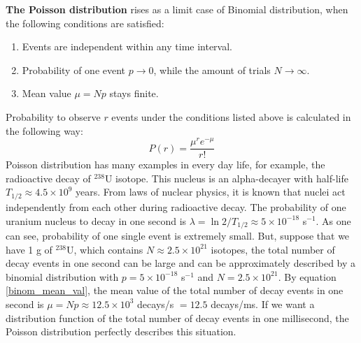 \documentclass[12pt,a4paper]{report}
\begin{document}
\newpage
\textbf{The Poisson distribution} rises as a limit case of Binomial distribution, when the following conditions are satisfied:
\begin{enumerate}
\item Events are independent within any time interval.
\item Probability of one event $p \rightarrow 0$, while the amount of trials $N \rightarrow \infty$. 
\item Mean value $\mu = Np$ stays finite.
\end{enumerate}
Probability to observe $r$ events under the conditions listed above is calculated in the following way:
\begin{equation} \label{poisson_dist}
P(r) = \frac{\mu^r e^{-\mu}}{r!}
\end{equation}
Poisson distribution has many examples in every day life, for example, the radioactive decay of $^{238}$U isotope. This nucleus is an alpha-decayer with half-life $T_{1/2} \approx 4.5 \times 10^9$ years. From laws of nuclear physics, it is known that nuclei act independently from each other during radioactive decay. The probability of one uranium nucleus to decay in one second is $\lambda = \ln2 /T_{1/2} \approx 5 \times 10^{-18}$ s$^{-1}$. As one can see, probability of one single event is extremely small. But, suppose that we have 1 g of $^{238}$U, which contains $N \approx 2.5 \times 10^{21}$ isotopes, the total number of decay events in one second can be large and can be approximately described by a binomial distribution with $p = 5 \times 10^{-18}$ s$^{-1}$ and $N = 2.5 \times 10^{21}$. By equation \ref{binom_mean_val}, the mean value of the total number of decay events in one second is $\mu = Np \approx 12.5 \times 10^3$ decays/s $ = 12.5 $ decays/ms. If we want a distribution function of the total number of decay events in one millisecond, the Poisson distribution perfectly describes this situation. \par
\end{document}
